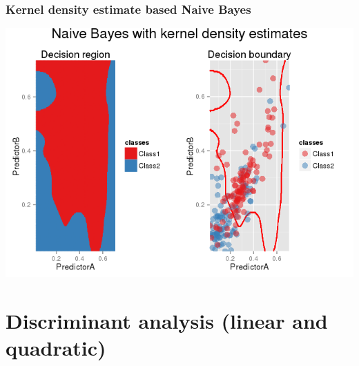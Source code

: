 \documentclass[9pt]{beamer}
\begin{document}
\begin{frame}
\frametitle{Kernel density estimate based Naive Bayes }
\begin{center}
\hspace*{-.05\textwidth}\includegraphics[height=.65\textheight]{Naive_Bayes_with_kernel_density_estimation-1}
\end{center}
\end{frame}

\section{Discriminant analysis (linear and quadratic)}
\end{document}
